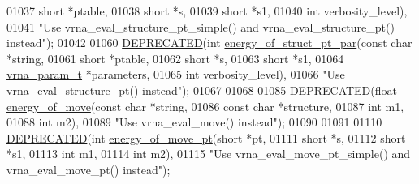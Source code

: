 \begin{DoxyCode}
01037                                       \textcolor{keywordtype}{short}       *ptable,
01038                                       \textcolor{keywordtype}{short}       *s,
01039                                       \textcolor{keywordtype}{short}       *s1,
01040                                       \textcolor{keywordtype}{int}         verbosity\_level),
01041            \textcolor{stringliteral}{"Use vrna\_eval\_structure\_pt\_simple() and vrna\_eval\_structure\_pt() instead"});
01042 
01060 \mbox{\hyperlink{eval_8h_aab347a3c03fbe8e7319551b9fa0cce4a}{DEPRECATED}}(\textcolor{keywordtype}{int} \mbox{\hyperlink{group__eval_ga49acb3d5627dc6823a7ce12d116d4c69}{energy\_of\_struct\_pt\_par}}(\textcolor{keyword}{const} \textcolor{keywordtype}{char}   *\textcolor{keywordtype}{string},
01061                                        \textcolor{keywordtype}{short}        *ptable,
01062                                        \textcolor{keywordtype}{short}        *s,
01063                                        \textcolor{keywordtype}{short}        *s1,
01064                                        \mbox{\hyperlink{group__energy__parameters_structvrna__param__s}{vrna\_param\_t}} *parameters,
01065                                        \textcolor{keywordtype}{int}          verbosity\_level),
01066            \textcolor{stringliteral}{"Use vrna\_eval\_structure\_pt() instead"});
01067 
01068 
01085 \mbox{\hyperlink{eval_8h_aab347a3c03fbe8e7319551b9fa0cce4a}{DEPRECATED}}(\textcolor{keywordtype}{float} \mbox{\hyperlink{group__eval_ga539ecaed89730f7644c202f304d7529b}{energy\_of\_move}}(\textcolor{keyword}{const} \textcolor{keywordtype}{char}  *\textcolor{keywordtype}{string},
01086                                 \textcolor{keyword}{const} \textcolor{keywordtype}{char}  *structure,
01087                                 \textcolor{keywordtype}{int}         m1,
01088                                 \textcolor{keywordtype}{int}         m2),
01089            \textcolor{stringliteral}{"Use vrna\_eval\_move() instead"});
01090 
01091 
01110 \mbox{\hyperlink{eval_8h_aab347a3c03fbe8e7319551b9fa0cce4a}{DEPRECATED}}(\textcolor{keywordtype}{int} \mbox{\hyperlink{group__eval_ga49e0ee561be69faf0568213546f6a53f}{energy\_of\_move\_pt}}(\textcolor{keywordtype}{short}  *pt,
01111                                  \textcolor{keywordtype}{short}  *s,
01112                                  \textcolor{keywordtype}{short}  *s1,
01113                                  \textcolor{keywordtype}{int}    m1,
01114                                  \textcolor{keywordtype}{int}    m2),
01115            \textcolor{stringliteral}{"Use vrna\_eval\_move\_pt\_simple() and vrna\_eval\_move\_pt() instead"});

\end{DoxyCode}
